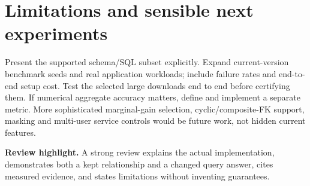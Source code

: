 \documentclass[11pt,a4paper,oneside]{report}
\newcommand{\reviewpoint}[1]{\par\begingroup\setlength{\fboxsep}{9pt}\noindent\colorbox{wash}{\parbox{\dimexpr\linewidth-18pt\relax}{\textbf{Review highlight.} #1}}\endgroup\par}
\begin{document}
\section{Limitations and sensible next experiments}
Present the supported schema/SQL subset explicitly. Expand current-version benchmark seeds and real application workloads; include failure rates and end-to-end setup cost. Test the selected large downloads end to end before certifying them. If numerical aggregate accuracy matters, define and implement a separate metric. More sophisticated marginal-gain selection, cyclic/composite-FK support, masking and multi-user service controls would be future work, not hidden current features.

\reviewpoint{A strong review explains the actual implementation, demonstrates both a kept relationship and a changed query answer, cites measured evidence, and states limitations without inventing guarantees.}

\appendix




\end{document}

